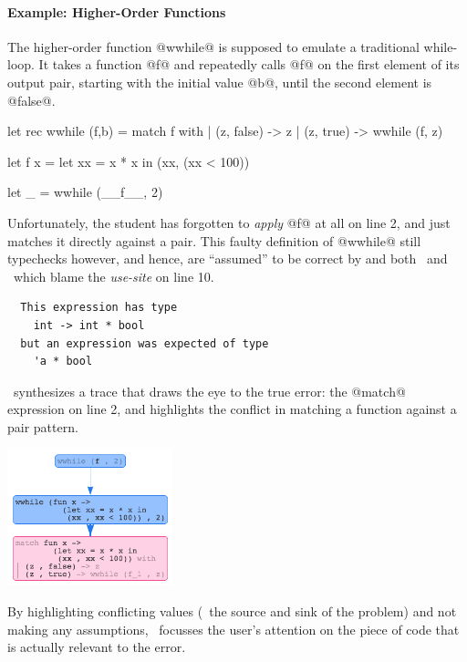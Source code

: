 \paragraph{Example: Higher-Order Functions}
%
The higher-order function @wwhile@ is supposed
to emulate a traditional while-loop. It takes
a function @f@ and repeatedly calls @f@ on the
first element of its output pair, starting with
the initial value @b@, until the second element
is @false@.
%
\begin{ecode}
  let rec wwhile (f,b) =
    match f with
    | (z, false) -> z
    | (z, true)  -> wwhile (f, z)

  let f x =
    let xx = x * x in
    (xx, (xx < 100))

  let _ = wwhile (__f__, 2)
\end{ecode}
%
Unfortunately, the student has forgotten to \emph{apply}
@f@ at all on line 2, and just matches it directly against
a pair.
This faulty definition of @wwhile@ still typechecks however,
and hence, are ``assumed'' to be correct by and both \ocaml\
and \sherrloc\ which blame the \emph{use-site} on line 10.
%
\begin{verbatim}
  This expression has type
    int -> int * bool
  but an expression was expected of type
    'a * bool
\end{verbatim}
%
\toolname\ synthesizes a trace that draws the eye to the
true error: the @match@ expression on line 2, and highlights
the conflict in matching a function against a pair pattern.
%
\begin{center}
  \includegraphics[height=150px]{wwhile.png}
\end{center}
%
By highlighting conflicting values (\ie\ the source and sink
of the problem) and not making any assumptions, \toolname\
focusses the user's attention on the piece of code that is
actually relevant to the error.


